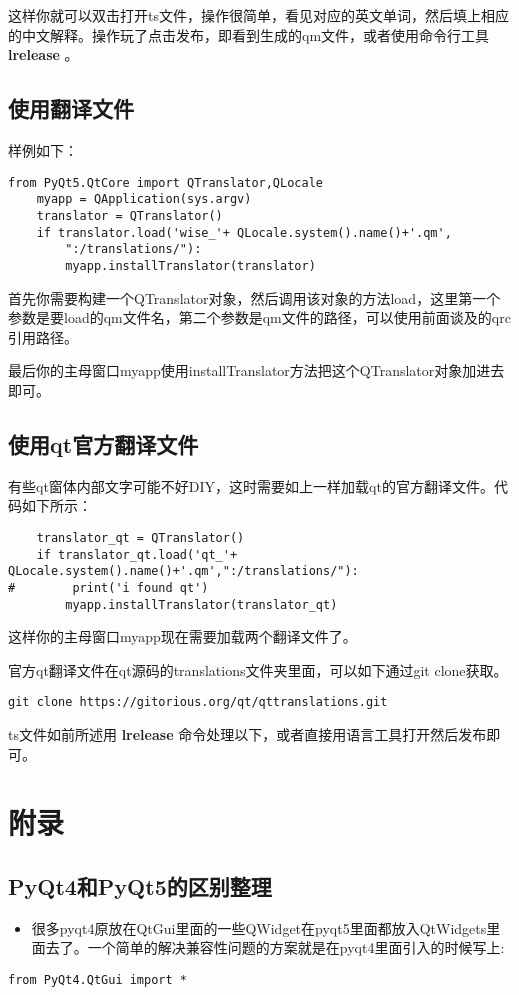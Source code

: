 \documentclass[11pt,oneside]{article}
\begin{document}
这样你就可以双击打开ts文件，操作很简单，看见对应的英文单词，然后填上相应的中文解释。操作玩了点击发布，即看到生成的qm文件，或者使用命令行工具 \textbf{lrelease} 。

\subsection{使用翻译文件}
\label{sec:orgheadline43}
样例如下：
\begin{verbatim}
from PyQt5.QtCore import QTranslator,QLocale
    myapp = QApplication(sys.argv)
    translator = QTranslator()
    if translator.load('wise_'+ QLocale.system().name()+'.qm',
        ":/translations/"):
        myapp.installTranslator(translator)
\end{verbatim}

首先你需要构建一个QTranslator对象，然后调用该对象的方法load，这里第一个参数是要load的qm文件名，第二个参数是qm文件的路径，可以使用前面谈及的qrc引用路径。

最后你的主母窗口myapp使用installTranslator方法把这个QTranslator对象加进去即可。

\subsection{使用qt官方翻译文件}
\label{sec:orgheadline44}
有些qt窗体内部文字可能不好DIY，这时需要如上一样加载qt的官方翻译文件。代码如下所示：
\begin{verbatim}
    translator_qt = QTranslator()
    if translator_qt.load('qt_'+ QLocale.system().name()+'.qm',":/translations/"):
#        print('i found qt')
        myapp.installTranslator(translator_qt)
\end{verbatim}


这样你的主母窗口myapp现在需要加载两个翻译文件了。

官方qt翻译文件在qt源码的translations文件夹里面，可以如下通过git clone获取。
\begin{verbatim}
git clone https://gitorious.org/qt/qttranslations.git
\end{verbatim}

ts文件如前所述用 \textbf{lrelease} 命令处理以下，或者直接用语言工具打开然后发布即可。



\section{附录}
\label{sec:orgheadline50}
\subsection{PyQt4和PyQt5的区别整理}
\label{sec:orgheadline46}
\begin{itemize}
\item 很多pyqt4原放在QtGui里面的一些QWidget在pyqt5里面都放入QtWidgets里面去了。一个简单的解决兼容性问题的方案就是在pyqt4里面引入的时候写上:
\end{itemize}
\begin{Verbatim}
from PyQt4.QtGui import *
\end{Verbatim}
\end{document}
